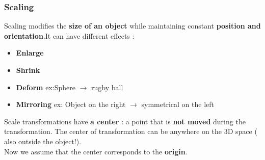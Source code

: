 \subsubsection{Scaling}
Scaling modifies the \textbf{size of an object} while maintaining constant \textbf{position and orientation}.It can have different effects :
\begin{itemize}
\item \textbf{Enlarge}
\item \textbf{Shrink}
\item \textbf{Deform} ex:Sphere $\to$ rugby ball
\item \textbf{Mirroring} ex: Object on the right $\to$ symmetrical on the left
\end{itemize}
Scale transformations have \textbf{a center} : a point that is \textbf{not moved} during the transformation. The center of transformation can be anywhere on the 3D space ( also outside the object!).\\
Now we assume that the center corresponds to the \textbf{origin}.\\
